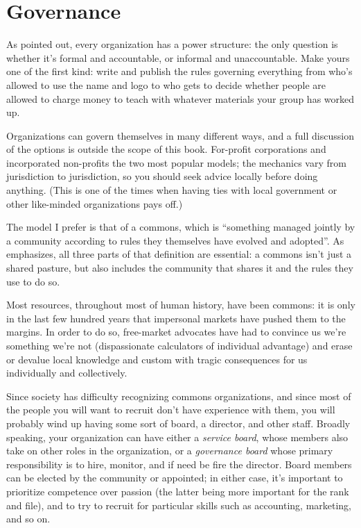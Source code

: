 \section{Governance}\label{s:community-governance}

As \cite{Free1972} pointed out, every organization has a power
structure: the only question is whether it's formal and accountable,
or informal and unaccountable. Make yours one of the first kind: write
and publish the rules governing everything from who's allowed to use
the name and logo to who gets to decide whether people are allowed to
charge money to teach with whatever materials your group has worked
up.

Organizations can govern themselves in many different ways, and a full
discussion of the options is outside the scope of this book.
For-profit corporations and incorporated non-profits the two most
popular models; the mechanics vary from jurisdiction to jurisdiction,
so you should seek advice locally before doing anything.  (This is one
of the times when having ties with local government or other
like-minded organizations pays off.)

The model I prefer is that of a commons, which is ``something managed
jointly by a community according to rules they themselves have evolved
and adopted''.  As \cite{Boll2014} emphasizes, all three parts of that
definition are essential: a commons isn't just a shared pasture, but
also includes the community that shares it and the rules they use to
do so.

Most resources, throughout most of human history, have been commons:
it is only in the last few hundred years that impersonal markets have
pushed them to the margins. In order to do so, free-market advocates
have had to convince us we're something we're not (dispassionate
calculators of individual advantage) and erase or devalue local
knowledge and custom with tragic consequences for us individually and
collectively.

Since society has difficulty recognizing commons organizations, and
since most of the people you will want to recruit don't have experience
with them, you will probably wind up having some sort of board, a
director, and other staff. Broadly speaking, your organization can have
either a \emph{service board}, whose members also take on other roles in
the organization, or a \emph{governance board} whose primary
responsibility is to hire, monitor, and if need be fire the director.
Board members can be elected by the community or appointed; in either
case, it's important to prioritize competence over passion (the latter
being more important for the rank and file), and to try to recruit for
particular skills such as accounting, marketing, and so on.

